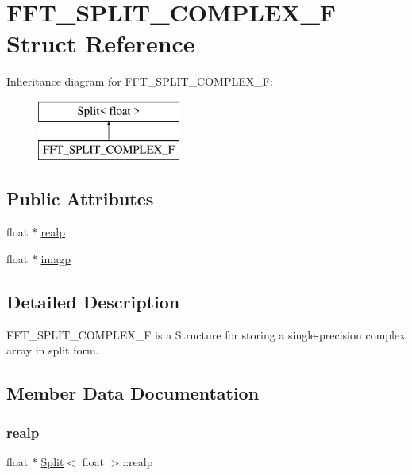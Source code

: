 \hypertarget{struct_float_split}{}\section{F\+F\+T\+\_\+\+S\+P\+L\+I\+T\+\_\+\+C\+O\+M\+P\+L\+E\+X\+\_\+F Struct Reference}
\label{struct_float_split}
Inheritance diagram for F\+F\+T\+\_\+\+S\+P\+L\+I\+T\+\_\+\+C\+O\+M\+P\+L\+E\+X\+\_\+F\+:\begin{figure}[H]
\begin{center}
\leavevmode
\includegraphics[height=2.000000cm]{struct_float_split}
\end{center}
\end{figure}
\subsection*{Public Attributes}
\begin{DoxyCompactItemize}
\item 
float $\ast$ \hyperlink{struct_split_aaadcedfa082d6f07b33cd89ea4f19814}{realp}
\item 
float $\ast$ \hyperlink{struct_split_a21ff23a96abee0c0ed6a2433798c4eac}{imagp}
\end{DoxyCompactItemize}


\subsection{Detailed Description}
F\+F\+T\+\_\+\+S\+P\+L\+I\+T\+\_\+\+C\+O\+M\+P\+L\+E\+X\+\_\+F is a Structure for storing a single-\/precision complex array in split form. 

\subsection{Member Data Documentation}
\mbox{\label{struct_split_aaadcedfa082d6f07b33cd89ea4f19814}} 
\subsubsection{\texorpdfstring{realp}{realp}}
{\footnotesize\ttfamily float $\ast$ \hyperlink{struct_split}{Split}$<$ float  $>$\+::realp\hspace{0.3cm}{\ttfamily [inherited]}}

